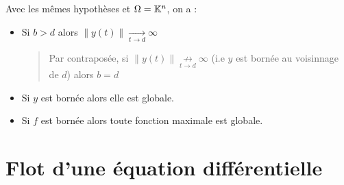 \begin{theorem}[Explosion]
    Avec les mêmes hypothèses et $\Omega = \mathbb{K}^n$, on a : 
    \begin{itemize}
        \item Si $b > d$ alors $ \| y(t) \| \underset{t \to d}{\longrightarrow} \infty $ 
            \begin{quote}
                Par contraposée, si $ \| y(t) \| \underset{t \to d}{ \not \longrightarrow} \infty $ 
                (i.e $y$ est bornée au voisinnage de $d$) alors $b = d$
            \end{quote}
        \item Si $y$ est bornée alors elle est globale. 
        \item Si $f$ est bornée alors toute fonction maximale est globale. 
    \end{itemize}
\end{theorem}



\section{Flot d'une équation différentielle}

